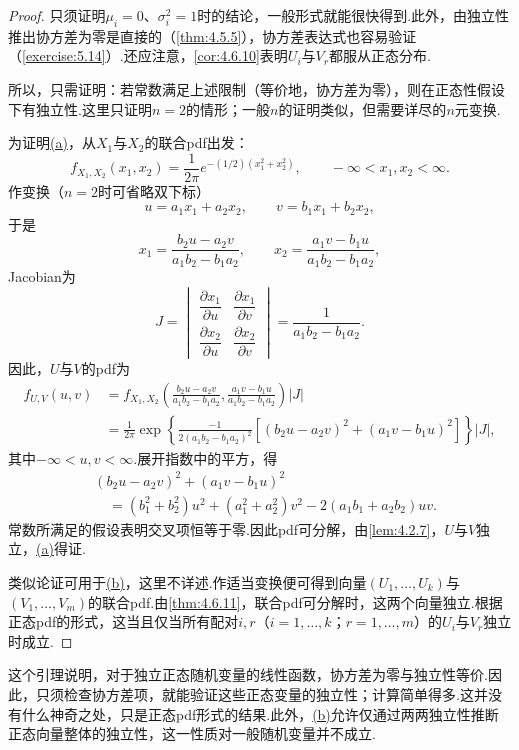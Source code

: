 \begin{proof}
只须证明$\mu_i=0$、$\sigma_i^2=1$时的结论，一般形式就能很快得到.此外，由独立性推出协方差为零是直接的（\autoref{thm:4.5.5}），协方差表达式也容易验证（\autoref{exercise:5.14}）.还应注意，\autoref{cor:4.6.10}表明$U_i$与$V_r$都服从正态分布.

所以，只需证明：若常数满足上述限制（等价地，协方差为零），则在正态性假设下有独立性.这里只证明$n=2$的情形；一般$n$的证明类似，但需要详尽的$n$元变换.

为证明\hyperref[item:5.3.3a]{(a)}，从$X_1$与$X_2$的联合pdf出发：
$$f_{X_1,X_2}(x_1,x_2)=\frac1{2\pi}e^{-(1/2)(x_1^2+x_2^2)},\qquad -\infty<x_1,x_2<\infty.$$
作变换（$n=2$时可省略双下标）
$$u=a_1x_1+a_2x_2,\qquad v=b_1x_1+b_2x_2,$$
于是
$$x_1=\frac{b_2u-a_2v}{a_1b_2-b_1a_2},\qquad x_2=\frac{a_1v-b_1u}{a_1b_2-b_1a_2},$$
Jacobian为
$$J=\begin{vmatrix}\dfrac{\partial x_1}{\partial u}&\dfrac{\partial x_1}{\partial v}\\[4pt]\dfrac{\partial x_2}{\partial u}&\dfrac{\partial x_2}{\partial v}\end{vmatrix}=\frac1{a_1b_2-b_1a_2}.$$
因此，$U$与$V$的pdf为
\begin{align*}
f_{U,V}(u,v)&=f_{X_1,X_2}\left(\frac{b_2u-a_2v}{a_1b_2-b_1a_2},\frac{a_1v-b_1u}{a_1b_2-b_1a_2}\right)|J|\\
&=\frac1{2\pi}\exp\left\{\frac{-1}{2(a_1b_2-b_1a_2)^2}[(b_2u-a_2v)^2+(a_1v-b_1u)^2]\right\}|J|,
\end{align*}
其中$-\infty<u,v<\infty$.展开指数中的平方，得
$$\begin{aligned}
&(b_2u-a_2v)^2+(a_1v-b_1u)^2\\
&\quad=(b_1^2+b_2^2)u^2+(a_1^2+a_2^2)v^2-2(a_1b_1+a_2b_2)uv.
\end{aligned}$$
常数所满足的假设表明交叉项恒等于零.因此pdf可分解，由\autoref{lem:4.2.7}，$U$与$V$独立，\hyperref[item:5.3.3a]{(a)}得证.

类似论证可用于\hyperref[item:5.3.3b]{(b)}，这里不详述.作适当变换便可得到向量$(U_1,\ldots,U_k)$与$(V_1,\ldots,V_m)$的联合pdf.由\autoref{thm:4.6.11}，联合pdf可分解时，这两个向量独立.根据正态pdf的形式，这当且仅当所有配对$i,r$（$i=1,\ldots,k$；$r=1,\ldots,m$）的$U_i$与$V_r$独立时成立.
\end{proof}
这个引理说明，对于独立正态随机变量的线性函数，协方差为零与独立性等价.因此，只须检查协方差项，就能验证这些正态变量的独立性；计算简单得多.这并没有什么神奇之处，只是正态pdf形式的结果.此外，\hyperref[item:5.3.3b]{(b)}允许仅通过两两独立性推断正态向量整体的独立性，这一性质对一般随机变量并不成立.

